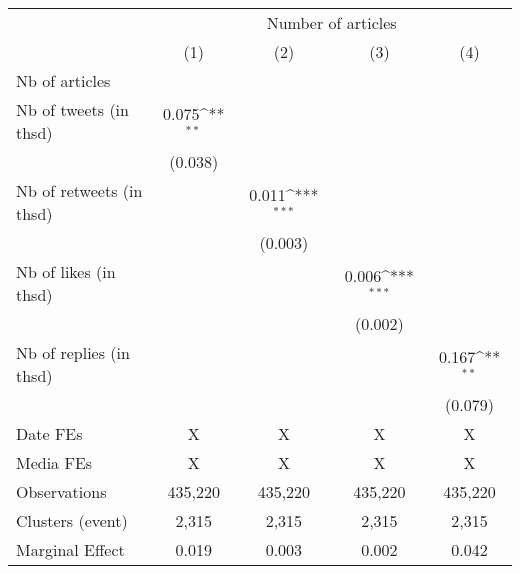 {
\def\sym#1{\ifmmode^{#1}\else\(^{#1}\)\fi}
\begin{tabular}{l*{4}{c}}
\hline\hline
                    &\multicolumn{4}{c}{Number of articles}                                                 \\\cmidrule(lr){2-5}
                    &\multicolumn{1}{c}{(1)}         &\multicolumn{1}{c}{(2)}         &\multicolumn{1}{c}{(3)}         &\multicolumn{1}{c}{(4)}         \\
\hline
Nb of articles      &                     &                     &                     &                     \\
Nb of tweets (in thsd)&       0.075\sym{**} &                     &                     &                     \\
                    &     (0.038)         &                     &                     &                     \\
Nb of retweets (in thsd)&                     &       0.011\sym{***}&                     &                     \\
                    &                     &     (0.003)         &                     &                     \\
Nb of likes (in thsd)&                     &                     &       0.006\sym{***}&                     \\
                    &                     &                     &     (0.002)         &                     \\
Nb of replies (in thsd)&                     &                     &                     &       0.167\sym{**} \\
                    &                     &                     &                     &     (0.079)         \\
\hline
Date FEs            &           X         &           X         &           X         &           X         \\
Media FEs           &           X         &           X         &           X         &           X         \\
Observations        &     435,220         &     435,220         &     435,220         &     435,220         \\
Clusters (event)    &       2,315         &       2,315         &       2,315         &       2,315         \\
Marginal Effect     &       0.019         &       0.003         &       0.002         &       0.042         \\
\hline\hline
\end{tabular}
}

